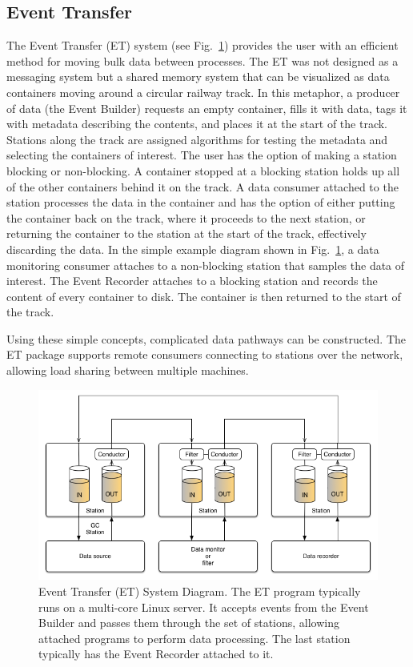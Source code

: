 \subsection{Event Transfer}

The Event Transfer (ET) system (see Fig.~\ref{fig:et_diagram}) provides the user with an efficient method for moving
bulk data between processes. The ET was not designed as a messaging system but a shared memory system that can be
visualized as data containers moving around a circular railway track. In this metaphor, a producer of data (the Event
Builder) requests an empty container, fills it with data, tags it with metadata describing the contents, and places it at the
start of the track. Stations along the track are assigned algorithms for testing the metadata and selecting the containers
of interest. The user has the option of making a station blocking or non-blocking. A container stopped at a blocking station
holds up all of the other containers behind it on the track. A data consumer attached to the station processes the data in
the container and has the option of either putting the container back on the track, where it proceeds to the next station,
or returning the container to the station at the start of the track, effectively discarding the data. In the simple example
diagram shown in Fig.~\ref{fig:et_diagram}, a data monitoring consumer attaches to a non-blocking station that samples
the data of interest. The Event Recorder attaches to a blocking station and records the content of every container to disk.
The container is then returned to the start of the track.

Using these simple concepts, complicated data pathways can be constructed. The ET package supports remote consumers
connecting to stations over the network, allowing load sharing between multiple machines. 

\begin{figure}[hbt]
	\centering
	\includegraphics[width=1.0\columnwidth,keepaspectratio]{img/et_diagram.png}
	\caption{Event Transfer (ET) System Diagram. The ET program typically runs on a multi-core Linux server. It accepts
          events from the Event Builder and passes them through the set of stations, allowing attached programs to perform
          data processing. The last station typically has the Event Recorder attached to it.}
	\label{fig:et_diagram}
\end{figure}

